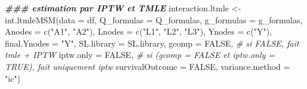 \documentclass[
]{book}
\newenvironment{Shaded}{\begin{snugshade}}{\end{snugshade}}
\newcommand{\AttributeTok}[1]{\textcolor[rgb]{0.77,0.63,0.00}{#1}}
\newcommand{\CommentTok}[1]{\textcolor[rgb]{0.56,0.35,0.01}{\textit{#1}}}
\newcommand{\ConstantTok}[1]{\textcolor[rgb]{0.00,0.00,0.00}{#1}}
\newcommand{\DocumentationTok}[1]{\textcolor[rgb]{0.56,0.35,0.01}{\textbf{\textit{#1}}}}
\newcommand{\FunctionTok}[1]{\textcolor[rgb]{0.00,0.00,0.00}{#1}}
\newcommand{\NormalTok}[1]{#1}
\newcommand{\OtherTok}[1]{\textcolor[rgb]{0.56,0.35,0.01}{#1}}
\newcommand{\StringTok}[1]{\textcolor[rgb]{0.31,0.60,0.02}{#1}}
\begin{document}
\begin{Shaded}
\begin{Highlighting}[]
\DocumentationTok{\#\#\# estimation par IPTW et TMLE}
\NormalTok{  interaction.ltmle }\OtherTok{\textless{}{-}} \FunctionTok{int.ltmleMSM}\NormalTok{(}\AttributeTok{data =}\NormalTok{ df,}
                                  \AttributeTok{Q\_formulas =}\NormalTok{ Q\_formulas,}
                                  \AttributeTok{g\_formulas =}\NormalTok{ g\_formulas,}
                                  \AttributeTok{Anodes =} \FunctionTok{c}\NormalTok{(}\StringTok{"A1"}\NormalTok{, }\StringTok{"A2"}\NormalTok{),}
                                  \AttributeTok{Lnodes =} \FunctionTok{c}\NormalTok{(}\StringTok{"L1"}\NormalTok{, }\StringTok{"L2"}\NormalTok{, }\StringTok{"L3"}\NormalTok{),}
                                  \AttributeTok{Ynodes =} \FunctionTok{c}\NormalTok{(}\StringTok{"Y"}\NormalTok{),}
                                  \AttributeTok{final.Ynodes =} \StringTok{"Y"}\NormalTok{,}
                                  \AttributeTok{SL.library =}\NormalTok{ SL.library,}
                                  \AttributeTok{gcomp =} \ConstantTok{FALSE}\NormalTok{,            }\CommentTok{\# si FALSE, fait tmle + IPTW}
                                  \AttributeTok{iptw.only =} \ConstantTok{FALSE}\NormalTok{,}
                                  \CommentTok{\# si (gcomp = FALSE et iptw.only = TRUE), fait uniquement iptw}
                                  \AttributeTok{survivalOutcome =} \ConstantTok{FALSE}\NormalTok{,}
                                  \AttributeTok{variance.method =} \StringTok{"ic"}\NormalTok{)}


\end{Highlighting}
\end{Shaded}
\end{document}
